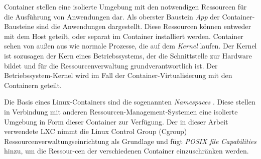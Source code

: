 Container stellen eine isolierte Umgebung mit den notwendigen Ressourcen für die Ausführung von Anwendungen dar. Als oberster Baustein \emph{App} der Container-Bausteine sind die Anwendungen dargestellt. Diese Ressourcen können entweder mit dem Host geteilt, oder separat im Container installiert werden. Container sehen von außen aus wie normale Prozesse, die auf dem \emph{Kernel} laufen. Der Kernel ist sozusagen der Kern eines Betriebssystems, der die Schnittstelle zur Hardware bildet und für die Ressourcenverwaltung grundverantwortlich ist. Der Betriebssystem-Kernel wird im Fall der Container-Virtualisierung mit den Containern geteilt. 

Die Basis eines Linux-Containers sind die sogenannten \emph{Namespaces} \cite{}. Diese stellen in Verbindung mit anderen Ressourcen-Management-Systemen eine isolierte Umgebung in Form dieser Container zur Verfügung. Der in dieser Arbeit verwendete LXC nimmt die Linux Control Group (Cgroup) \cite{Heo2015ControlV2} Ressourcenverwaltungseinrichtung als Grundlage und fügt \emph{POSIX file Capabilities} \cite{Overview2018PaperLinux-VServer} hinzu, um die Ressour-cen der verschiedenen Container einzuschränken werden.







